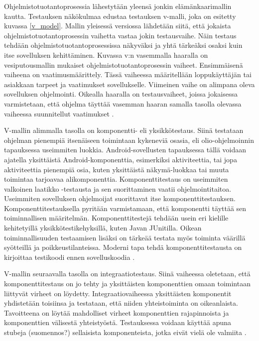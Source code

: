 Ohjelmistotuotantoprosessia lähestytään yleensä jonkin elämänkaarimallin kautta. Testauksen näkökulmaa edustaa testauksen v-malli, joka on esitetty kuvassa \ref{v_model}. Mallin yleisessä versiossa lähdetään siitä, että jokaista ohjelmistotuotantoprosessin vaihetta vastaa jokin testausvaihe. Näin testaus tehdään ohjelmistotuotantoprosessissa näkyväksi ja yhtä tärkeäksi osaksi kuin itse sovelluksen kehittäminen. Kuvassa v:n vasemmalla haaralla on vesiputousmallin mukaiset ohjelmistotuotantoprosessin vaiheet. Ensimmäisenä vaiheena on vaatimusmäärittely. Tässä vaiheessa määritellään loppukäyttäjän tai asiakkaan tarpeet ja vaatimukset sovellukselle.  Viimeinen vaihe on alimpana oleva sovelluksen ohjelmointi. Oikealla haaralla on testausvaiheet, joissa jokaisessa varmistetaan, että ohjelma täyttää vasemman haaran samalla tasolla olevassa vaiheessa suunnitellut vaatimukset \cite[39-42]{testing_foundations}.

V-mallin alimmalla tasolla on komponentti- eli yksikkötestaus. Siinä testataan ohjelman pienempiä itsenäiseen toimintaan kykeneviä osasia, eli olio-ohjelmoinnin tapauksessa useimmiten luokkia. Android-sovellusten tapauksessa tällä voidaan ajatella yksittäistä Android-komponenttia, esimerkiksi aktiviteettia, tai jopa aktiviteettia pienempiä osia, kuten yksittäistä näkymä-luokkaa tai muuta toimintaa tarjoavaa alikomponenttia. Komponenttitestaus on useimmiten valkoinen laatikko -testausta ja sen suorittaminen vaatii ohjelmointitaitoa. Useimmiten sovelluksen ohjelmoijat suorittavat itse komponenttitestauksen. Komponenttitestauksella pyritään varmistamaan, että komponentti täyttää sen toiminnallisen määritelmän. Komponenttitestejä tehdään usein eri kielille kehitetyillä yksikkötestikehyksillä, kuten Javan JUnitilla. Oikean toiminnallisuuden testaamisen lisäksi on tärkeää testata myös toiminta väärillä syötteillä ja poikkeustilanteissa. Moderni tapa tehdä komponenttitestausta on kirjoittaa testikoodi ennen sovelluskoodia \cite[43-50]{testing_foundations}.

V-mallin seuraavalla tasolla on integraatiotestaus. Siinä vaiheessa oletetaan, että komponenttitestaus on jo tehty ja yksittäisten komponenttien omaan toimintaan liittyvät virheet on löydetty. Integraatiovaiheessa yksittäisten komponentit yhdistetään toisiinsa ja testataan, että niiden yhteistoiminta on oikeanlaista. Tavoitteena on löytää mahdolliset virheet komponenttien rajapinnoista ja komponenttien välisestä yhteistyöstä. Testauksessa voidaan käyttää apuna stubeja (suomennos?) sellaisista komponenteista, jotka eivät vielä ole valmiita \cite[50-52]{testing_foundations}.


